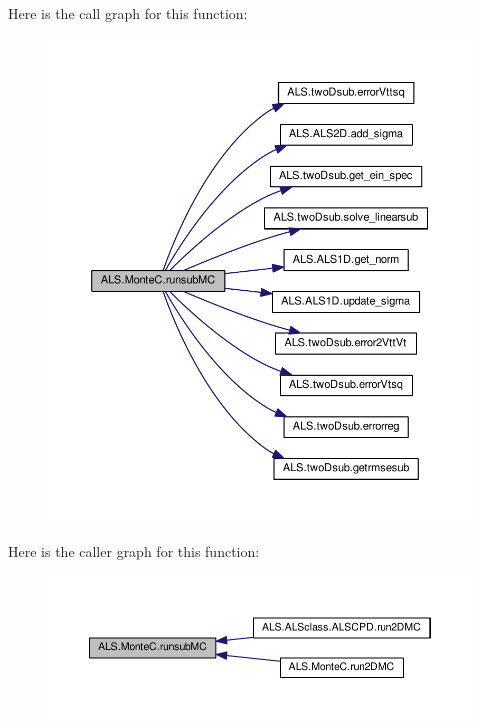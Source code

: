 Here is the call graph for this function\+:
\nopagebreak
\begin{figure}[H]
\begin{center}
\leavevmode
\includegraphics[width=350pt]{namespace_a_l_s_1_1_monte_c_a3da3c7ee66b0aa86760cd5490341d96d_cgraph}
\end{center}
\end{figure}




Here is the caller graph for this function\+:
\nopagebreak
\begin{figure}[H]
\begin{center}
\leavevmode
\includegraphics[width=350pt]{namespace_a_l_s_1_1_monte_c_a3da3c7ee66b0aa86760cd5490341d96d_icgraph}
\end{center}
\end{figure}


